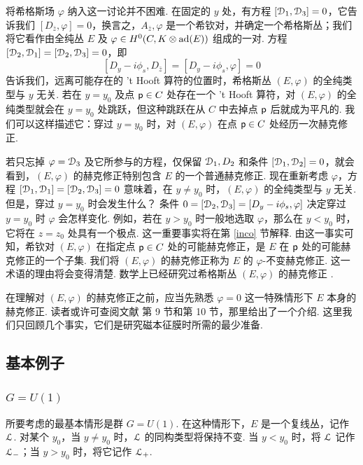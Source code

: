 将希格斯场 $\varphi$ 纳入这一讨论并不困难. 在固定的 $y$ 处，有方程 $[{\mathcal D}_1,{\mathcal D}_3]=0$，它告诉我们 $[D_{\bar z},\varphi]=0$，换言之，$A_{\bar z},\varphi$ 是一个希钦对，并确定一个希格斯丛；我们将它看作由全纯丛 $E$ 及 $\varphi\in H^0(C,K\otimes{\mathrm{ad}(E)})$ 组成的一对.
方程 $[{\mathcal D}_2,{\mathcal D}_1]=[{\mathcal D}_2,{\mathcal D}_3]=0$，即
\begin{equation}\label{dolgo}[D_y-i\phi_s,D_{\bar z}]=[D_y-i\phi_s,\varphi]=0 \end{equation}
告诉我们，远离可能存在的 't Hooft 算符的位置时，希格斯丛 $(E,\varphi)$ 的全纯类型与 $y$ 无关.
若在 $y=y_0$ 及点 ${\sf p}\in C$ 处存在一个 't Hooft 算符，对 $(E,\varphi)$ 的全纯类型就会在 $y=y_0$ 处跳跃，但这种跳跃在从 $C$ 中去掉点 ${\sf p}$ 后就成为平凡的. 我们可以这样描述它：穿过 $y=y_0$ 时，对 $(E,\varphi)$ 在点 ${\sf p}\in C$ 处经历一次赫克修正.

若只忘掉 $\varphi={\mathcal D}_3$ 及它所参与的方程，仅保留 ${\mathcal D}_1,D_2$ 和条件 $[{\mathcal D}_1,{\mathcal D}_2]=0$，就会看到，$(E,\varphi)$ 的赫克修正特别包含 $E$ 的一个普通赫克修正. 现在重新考虑 $\varphi$，方程 $[{\mathcal D}_1,{\mathcal D}_1]=[{\mathcal D}_2,{\mathcal D}_3]=0$ 意味着，在 $y\not=y_0$ 时，$(E,\varphi)$ 的全纯类型与 $y$ 无关. 但是，穿过 $y=y_0$ 时会发生什么？
条件 $0=[{\mathcal D}_2,{\mathcal D}_3]=[D_y-i\phi_s,\varphi]$ 决定穿过 $y=y_0$ 时 $\varphi$ 会怎样变化. 例如，若在 $y>y_0$ 时一般地选取 $\varphi$，那么在 $y<y_0$ 时，它将在 $z=z_0$ 处具有一个极点.
这一重要事实将在第 \ref{inco} 节解释. 由这一事实可知，希钦对 $(E,\varphi)$ 在指定点 ${\sf p}\in C$ 处的可能赫克修正，是 $E$ 在 ${\sf p}$ 处的可能赫克修正的一个子集. 我们将 $(E,\varphi)$ 的赫克修正称为 $E$ 的 $\varphi$-不变赫克修正. 这一术语的理由将会变得清楚. 数学上已经研究过希格斯丛 $(E,\varphi)$ 的赫克修正 \cite{donagip}.

在理解对 $(E,\varphi)$ 的赫克修正之前，应当先熟悉 $\varphi=0$ 这一特殊情形下 $E$ 本身的赫克修正.
读者或许可查阅文献 \cite{KW} 第 9 节和第 10 节，那里给出了一个介绍. 这里我们只回顾几个事实，它们是研究磁本征膜时所需的最少准备.


\subsection{基本例子}\label{basics}

\subsubsection{$G=U(1)$}\label{guone}

所要考虑的最基本情形是群 $G=U(1)$. 在这种情形下，$E$ 是一个复线丛，记作 ${\mathcal L}$.
对某个 $y_0$，当 $y\not=y_0$ 时，${\mathcal L}$ 的同构类型将保持不变. 当 $y<y_0$ 时，将 ${\mathcal L}$ 记作 ${\mathcal L}_-$；当 $y>y_0$ 时，将它记作 ${\mathcal L}_+$.

